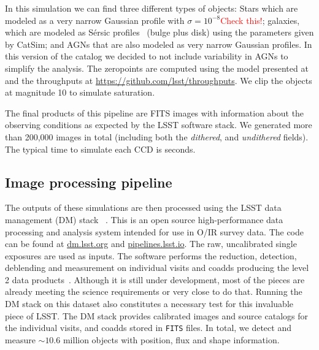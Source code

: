 \documentclass[\docopts]{\docclass}
\begin{document}
In this simulation we can find three different types of objects: Stars which are modeled as a very narrow Gaussian profile
with $\sigma=10^{-8}$\textcolor{red}{Check this!}; galaxies, which are modeled as S\'{e}rsic profiles~\citep{1963BAAA....6...41S} (bulge plus disk) using
the parameters given by CatSim; and AGNs that are also modeled as very narrow Gaussian profiles. In this version of the catalog we decided
to not include variability in AGNs to simplify the analysis. The zeropoints are computed using the model presented at~\citep{2008arXiv0805.2366I} and the
throughputs at \url{https://github.com/lsst/throughputs}. We clip the objects at magnitude 10 to simulate saturation.

The final products of this pipeline are FITS images with information about the observing conditions as expected by the LSST software stack. We generated more than 200,000 images in total (including both the \textit{dithered}, and \textit{undithered} fields). The typical time to simulate each CCD is  seconds.



\subsection{Image processing pipeline}
\label{sec:image_processing_pipeline}

The outputs of these simulations are then processed using the LSST data management (DM) stack~\citep{Overview,ScienceBook,WhitePaper,2017arXiv170506766B,2015arXiv151207914J} . This is an open
source high-performance data processing and analysis system intended for use in O/IR survey data. The code can be found at \url{dm.lsst.org} and \url{pipelines.lsst.io}. The raw, uncalibrated single exposures are used as inputs. The software performs the reduction, detection, deblending and measurement on individual visits and coadds producing the level 2 data products~\citep{2015arXiv151207914J}. Although it is still under development, most of the pieces are already meeting the science requirements or very close to do that. Running the DM stack on this dataset also constitutes a necessary test for this invaluable piece of LSST. The DM stack provides calibrated images and source catalogs for the individual visits, and coadds stored in \texttt{FITS} files. In total, we detect and measure $\sim 10.6$ million objects with position, flux and shape information.
\end{document}
